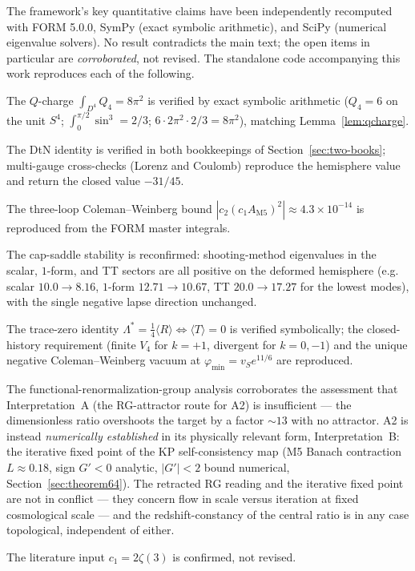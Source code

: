 \documentclass[11pt,a4paper]{article}
\theoremstyle{plain}
\theoremstyle{definition}
\theoremstyle{remark}
\newcommand{\avg}[1]{\langle #1 \rangle}
\begin{document}
The framework's key quantitative claims have been independently recomputed with FORM 5.0.0,
SymPy (exact symbolic arithmetic), and SciPy (numerical eigenvalue solvers). No result
contradicts the main text; the open items in particular are \emph{corroborated}, not revised.
The standalone code accompanying this work reproduces each of the following.
\begin{description}[leftmargin=2.4em,nosep,itemsep=2pt]
\item[M1-Q.] The $Q$-charge $\int_{D^4} Q_4 = 8\pi^2$ is verified by exact symbolic arithmetic
($Q_4 = 6$ on the unit $S^4$; $\int_0^{\pi/2}\sin^3 = 2/3$; $6\cdot 2\pi^2\cdot 2/3 = 8\pi^2$),
matching Lemma~\ref{lem:qcharge}.
\item[M1-$\zeta$.] The DtN identity is verified in both bookkeepings of
Section~\ref{sec:two-books}; multi-gauge cross-checks (Lorenz and Coulomb) reproduce the
hemisphere value and return the closed value $-31/45$.
\item[M1-3L.] The three-loop Coleman--Weinberg bound $|c_2 (c_1 A_{\mathrm{M5}})^2| \approx
4.3\times 10^{-14}$ is reproduced from the FORM master integrals.
\item[M1-H.] The cap-saddle stability is reconfirmed: shooting-method eigenvalues in the scalar,
$1$-form, and TT sectors are all positive on the deformed hemisphere (e.g. scalar
$10.0 \to 8.16$, $1$-form $12.71 \to 10.67$, TT $20.0 \to 17.27$ for the lowest modes), with the
single negative lapse direction unchanged.
\item[M1-$\Lambda$.] The trace-zero identity $\Lambda^* = \tfrac14\avg{R} \Leftrightarrow
\avg{T} = 0$ is verified symbolically; the closed-history requirement (finite $V_4$ for $k=+1$,
divergent for $k=0,-1$) and the unique negative Coleman--Weinberg vacuum at
$\varphi_{\min} = v_S e^{11/6}$ are reproduced.
\item[M1-FRG.] The functional-renormalization-group analysis corroborates the assessment that
Interpretation~A (the RG-attractor route for A2) is insufficient --- the dimensionless ratio
overshoots the target by a factor $\sim13$ with no attractor. A2 is instead \emph{numerically
established} in its physically relevant form, Interpretation~B: the iterative fixed point of the
KP self-consistency map (M5 Banach contraction $L\approx0.18$, sign $G'<0$ analytic, $|G'|<2$
bound numerical, Section~\ref{sec:theorem64}). The
retracted RG reading and the iterative fixed point are not in conflict --- they concern flow in
scale versus iteration at fixed cosmological scale --- and the redshift-constancy of the central
ratio is in any case topological, independent of either.
\item[M1-$c_1$.] The literature input $c_1 = 2\zeta(3)$ is confirmed, not revised.
\end{description}
\end{document}
